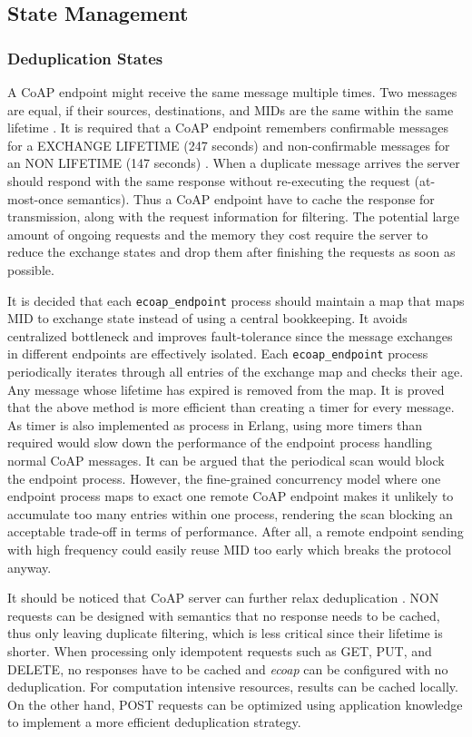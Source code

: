 \subsection{State Management}\label{state_management}

\subsubsection{Deduplication States}

A CoAP endpoint might receive the same message multiple times. Two messages are equal, if their sources, destinations, and MIDs are the same within the same lifetime \cite{lanter2013scalability}. It is required that a CoAP endpoint remembers confirmable messages for a EXCHANGE LIFETIME (247 seconds) and non-confirmable messages for an NON LIFETIME (147 seconds) \cite{coap_protocol}. When a duplicate message arrives the server should respond with the same response without re-executing the request (at-most-once semantics). Thus a CoAP endpoint have to cache the response for transmission, along with the request information for filtering. The potential large amount of ongoing requests and the memory they cost require the server to reduce the exchange states and drop them after finishing the requests as soon as possible. 

It is decided that each \verb|ecoap_endpoint| process should maintain a map that maps MID to exchange state instead of using a central bookkeeping. It avoids centralized bottleneck and improves fault-tolerance since the message exchanges in different endpoints are effectively isolated. Each \verb|ecoap_endpoint| process periodically iterates through all entries of the exchange map and checks their age. Any message whose lifetime has expired is removed from the map. It is proved that the above method is more efficient than creating a timer for every message. As timer is also implemented as process in Erlang, using more timers than required would slow down the performance of the endpoint process handling normal CoAP messages. It can be argued that the periodical scan would block the endpoint process. However, the fine-grained concurrency model where one endpoint process maps to exact one remote CoAP endpoint makes it unlikely to accumulate too many entries within one process, rendering the scan blocking an acceptable trade-off in terms of performance. After all, a remote endpoint sending with high frequency could easily reuse MID too early which breaks the protocol anyway.

It should be noticed that CoAP server can further relax deduplication \cite{coap_protocol}. NON requests can be designed with semantics that no response needs to be cached, thus only leaving duplicate filtering, which is less critical since their lifetime is shorter. When processing only idempotent requests such as GET, PUT, and DELETE, no responses have to be cached and \textit{ecoap} can be configured with no deduplication. For computation intensive resources, results can be cached locally. On the other hand, POST requests can be optimized using application knowledge to implement a more efficient deduplication strategy. 

